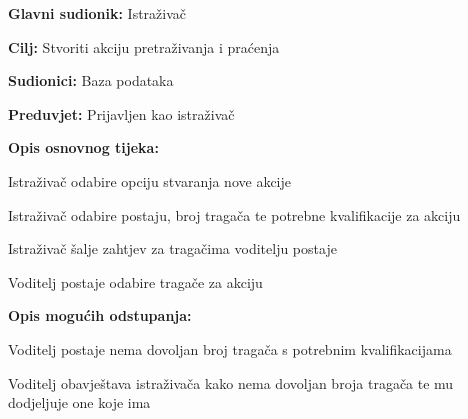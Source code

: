 					
					\noindent {}
					\begin{packed_item}
						
						\item \textbf{Glavni sudionik: }Istraživač
						\item  \textbf{Cilj:} Stvoriti akciju pretraživanja i praćenja
						\item  \textbf{Sudionici:} Baza podataka
						\item  \textbf{Preduvjet:} Prijavljen kao istraživač
						\item  \textbf{Opis osnovnog tijeka:}
						
						\item[] \begin{packed_enum}
							
							\item Istraživač odabire opciju stvaranja nove akcije
							\item Istraživač odabire postaju, broj tragača te potrebne kvalifikacije za akciju 
							\item Istraživač šalje zahtjev za tragačima voditelju postaje
							\item Voditelj postaje odabire tragače za akciju
							
							
						\end{packed_enum}
						
						\item  \textbf{Opis mogućih odstupanja:}
						
						\item[] \begin{packed_item}
							
							\item[4.a] Voditelj postaje nema dovoljan broj tragača s potrebnim kvalifikacijama
							\item[] \begin{packed_enum}
								
								\item Voditelj obavještava istraživača kako nema dovoljan broja tragača te mu dodjeljuje one koje ima
								
							\end{packed_enum}
							
						\end{packed_item}
						
					\end{packed_item}
					
